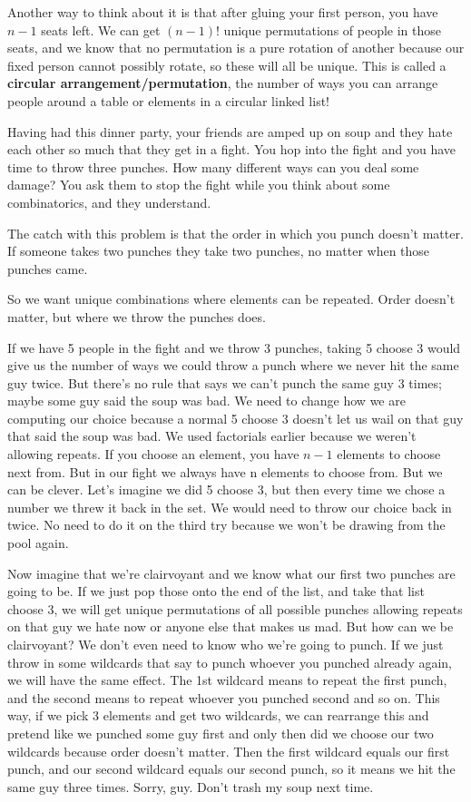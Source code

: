\documentclass{article}
\begin{document}
    Another way to think about it is that after gluing your first person, you have $n-1$ seats left.
    We can get $(n-1)!$ unique permutations of people in those seats, and we know that no permutation is a pure rotation of another
    because our fixed person cannot possibly rotate, so these will all be unique.
    This is called a \textbf{circular arrangement/permutation}, the number of ways you can arrange people around a table or elements in a circular linked list!

    Having had this dinner party, your friends are amped up on soup and they hate each other so much that they get in a fight.
    You hop into the fight and you have time to throw three punches.
    How many different ways can you deal some damage?
    You ask them to stop the fight while you think about some combinatorics, and they understand.

    The catch with this problem is that the order in which you punch doesn't matter.
    If someone takes two punches they take two punches, no matter when those punches came.

    So we want unique combinations where elements can be repeated.
    Order doesn't matter, but where we throw the punches does.

    If we have 5 people in the fight and we throw 3 punches, taking 5 choose 3 would give us the number of ways we could throw a punch where we never hit the same guy twice.
    But there's no rule that says we can't punch the same guy 3 times; maybe some guy said the soup was bad.
    We need to change how we are computing our choice because a normal 5 choose 3 doesn't let us wail on that guy that said the soup was bad.
    We used factorials earlier because we weren't allowing repeats.
    If you choose an element, you have $n-1$ elements to choose next from.
    But in our fight we always have n elements to choose from.
    But we can be clever.
    Let's imagine we did 5 choose 3, but then every time we chose a number we threw it back in the set.
    We would need to throw our choice back in twice.
    No need to do it on the third try because we won't be drawing from the pool again.

    Now imagine that we're clairvoyant and we know what our first two punches are going to be.
    If we just pop those onto the end of the list, and take that list choose 3, we will get unique permutations of all possible punches allowing repeats on that guy we hate now or anyone else that makes us mad.
    But how can we be clairvoyant?
    We don't even need to know who we're going to punch.
    If we just throw in some wildcards that say to punch whoever you punched already again, we will have the same effect.
    The 1st wildcard means to repeat the first punch, and the second means to repeat whoever you punched second and so on.
    This way, if we pick 3 elements and get two wildcards, we can rearrange this and pretend like we punched some guy first and only then did we choose our two wildcards because order doesn't matter.
    Then the first wildcard equals our first punch, and our second wildcard equals our second punch, so it means we hit the same guy three times.
    Sorry, guy. Don't trash my soup next time.
\end{document}
